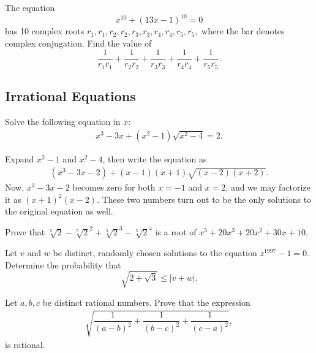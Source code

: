\documentclass[12pt,a4paper]{memoir}
\theoremstyle{definition}
\begin{document}
\begin{question}
	The equation\[ x^{10}+(13x-1)^{10}=0 \]has 10 complex roots $r_1, \overline{r_1}, r_2, \overline{r_2}, r_3, \overline{r_3}, r_4, \overline{r_4}, r_5, \overline{r_5},$ where the bar denotes complex conjugation. Find the value of\[ \frac 1{r_1\overline{r_1}}+\frac 1{r_2\overline{r_2}}+\frac 1{r_3\overline{r_3}}+\frac 1{r_4\overline{r_4}}+\frac 1{r_5\overline{r_5}}. \]
\end{question}

\subsection{Irrational Equations}

\begin{tcolorbox}
	\begin{question}
		Solve the following equation in $x$:
		\begin{align*}
			x^3-3x+(x^2-1)\sqrt{x^2-4}=2.
		\end{align*}
	\end{question}
\end{tcolorbox}

\begin{solution}
	Expand $x^2-1$ and $x^2-4$, then write the equation as
	\begin{align*}
		(x^3-3x-2)+(x-1)(x+1)\sqrt{(x-2)(x+2)}.
	\end{align*}
	Now, $x^3-3x-2$ becomes zero for both $x=-1$ and $x=2$, and we may factorize it as $(x+1)^2(x-2)$. These two numbers turn out to be the only solutions to the original equation as well.
\end{solution}


\begin{question}
	Prove that $\sqrt[ {5}]{2}-{\sqrt[ {5}]{2}}^{2}+{\sqrt[ {5}]{2}}^{3}-{\sqrt[ {5}]{2}}^{4}$ is a root of $x^{5}+20x^{3}+20x^{2}+30x+10$.
\end{question}

\begin{question}[name={1997 Switzerland TST}]
	Let $v$ and $w$ be distinct, randomly chosen solutions to the equation $z^{1997}-1=0$. Determine the probability that \[\sqrt{2+\sqrt{3}} \leq |v+w|.\]
\end{question}


\begin{question}[name={2009 Ecuador TST}]
	Let $a,b,c$ be distinct rational numbers. Prove that the expression
	\begin{align*}
		\sqrt{\dfrac{1}{(a-b)^2}+\dfrac{1}{(b-c)^2}+\dfrac{1}{(c-a)^2}},
	\end{align*}
	is rational.
\end{question}
\end{document}

